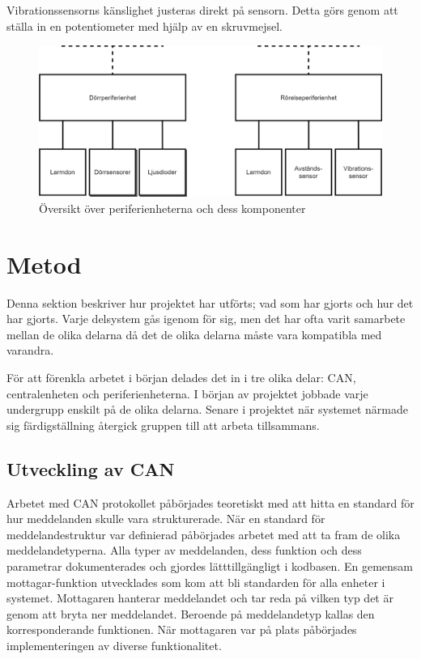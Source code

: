 \documentclass[a4paper]{article}
\begin{document}
Vibrationssensorns känslighet justeras direkt på sensorn.
Detta görs genom att ställa in en potentiometer med hjälp av en skruvmejsel.

\begin{figure}[H]
    \centering
    \includegraphics[width=\textwidth]{periferi-oversikt-pp.png}
    \caption{Översikt över periferienheterna och dess komponenter}
\end{figure}


\section{Metod}
Denna sektion beskriver hur projektet har utförts; vad som har gjorts och hur det har gjorts. 
Varje delsystem gås igenom för sig, men det har ofta varit samarbete mellan de olika delarna då det de olika delarna måste vara kompatibla med varandra. 

För att förenkla arbetet i början delades det in i tre olika delar: CAN, centralenheten och periferienheterna. 
I början av projektet jobbade varje undergrupp enskilt på de olika delarna.
Senare i projektet när systemet närmade sig färdigställning återgick gruppen till att arbeta tillsammans.

\subsection{Utveckling av CAN}
Arbetet med CAN protokollet påbörjades teoretiskt med att hitta en standard för hur meddelanden skulle vara strukturerade.
När en standard för meddelandestruktur var definierad påbörjades arbetet med att ta fram de olika meddelandetyperna.
Alla typer av meddelanden, dess funktion och dess parametrar dokumenterades och gjordes lätttillgängligt i kodbasen.
En gemensam mottagar-funktion utvecklades som kom att bli standarden för alla enheter i systemet.
Mottagaren hanterar meddelandet och tar reda på vilken typ det är genom att bryta ner meddelandet.
Beroende på meddelandetyp kallas den korresponderande funktionen.
När mottagaren var på plats påbörjades implementeringen av diverse funktionalitet.
\end{document}
